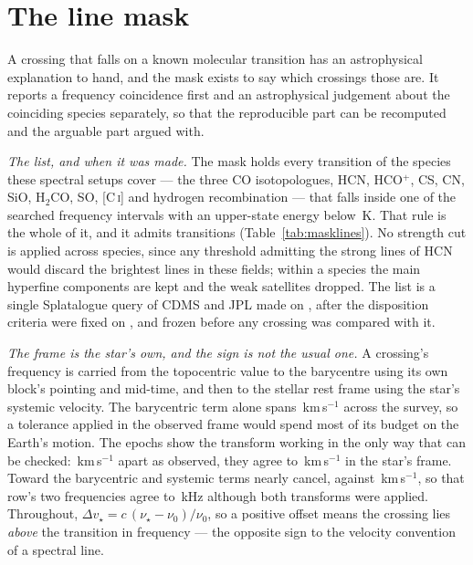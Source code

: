 \section{The line mask}
\label{app:linemask}

A crossing that falls on a known molecular transition has an astrophysical
explanation to hand, and the mask exists to say which crossings those are. It
reports a frequency coincidence first and an astrophysical judgement about
the coinciding species separately, so that the reproducible part can be
recomputed and the arguable part argued with.

\emph{The list, and when it was made.} The mask holds every transition of the
\FrNSpec{} species these spectral setups cover --- the three CO isotopologues,
HCN, HCO$^{+}$, CS, CN, SiO, H$_2$CO, SO, [C\,\textsc{i}] and hydrogen
recombination --- that falls inside one of the \McNIsland{} searched frequency
intervals with an upper-state energy below \McEuMax\,K. That rule is the whole
of it, and it admits \FrNTrans{} transitions (Table~\ref{tab:masklines}).
No strength cut is applied across species, since any threshold admitting the
strong lines of HCN would discard the brightest lines in these fields; within
a species the main hyperfine components are kept and the weak satellites
dropped. The list is a single Splatalogue query of CDMS and
JPL \citep{Pickett1998,CDMS2005} made on \MkListDate{}, after the disposition
criteria were fixed on \MkCritDate, and frozen before any crossing was
compared with it.

\emph{The frame is the star's own, and the sign is not the usual one.} A
crossing's frequency is carried from the topocentric value to the barycentre
using its own block's pointing and mid-time, and then to the stellar rest
frame using the star's systemic velocity. The barycentric term alone spans
\FrBarySwing\,km\,s$^{-1}$ across the survey, so a tolerance applied in the
observed frame would spend most of its budget on the Earth's motion. The
\FrEpochNEpoch{} \FrEpochStar{} epochs show
the transform working in the only way that can be checked:
\FrEpochTopoKms\,km\,s$^{-1}$ apart as observed, they agree to
\FrEpochStelKms\,km\,s$^{-1}$ in the star's frame. Toward \MkCancStar{} the
barycentric and systemic terms nearly cancel, \MkCancVBary{} against
\MkCancVSys\,km\,s$^{-1}$, so that row's two frequencies agree to
\MkCancNetkHz\,kHz although both transforms were applied.
Throughout, $\Delta v_\star = c\,(\nu_\star-\nu_0)/\nu_0$, so a positive
offset means the crossing lies \emph{above} the transition in frequency ---
the opposite sign to the velocity convention of a spectral line.

